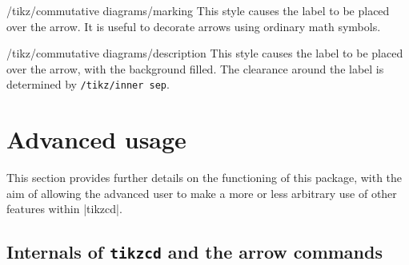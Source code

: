 \documentclass[a4paper]{ltxdoc}
\begin{document}
\begin{stylekey}{/tikz/commutative diagrams/marking}
  This style causes the label to be placed over the arrow.  It is
  useful to decorate arrows using ordinary math symbols.

\begin{codeexample}[]
\end{codeexample}
\end{stylekey}

\begin{stylekey}{/tikz/commutative diagrams/description}
  This style causes the label to be placed over the arrow, with the
  background filled.  The clearance around the label is determined by
  \texttt{/tikz/inner sep}.

\begin{codeexample}[]
\end{codeexample}
\end{stylekey}

\section{Advanced usage}
\label{sec:advanced-usage}

This section provides further details on the functioning of this
package, with the aim of allowing the advanced user to make a more or
less arbitrary use of other \tikzname{} features within |{tikzcd}|.

\subsection{Internals of \texttt{tikzcd} and the arrow commands}
\label{sec:intern-arrow-comm}
\end{document}
